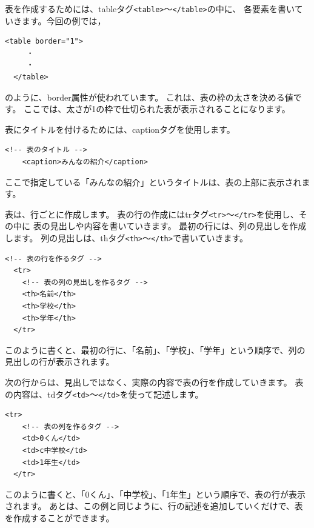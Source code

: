 \documentclass[text01.tex]{subfiles}
\begin{document}
\clearpage

表を作成するためには、tableタグ\texttt{<table>}～\texttt{</table>}の中に、
各要素を書いていきます。今回の例では，
\bigskip

\begin{lstlisting}[caption=表の作成,label=pwdtest,firstnumber=1]
  <table border="1">
     ・
     ・
  </table>
\end{lstlisting} 

\noindent%
のように、border属性が使われています。
これは、表の枠の太さを決める値です。
ここでは、太さが1の枠で仕切られた表が表示されることになります。

表にタイトルを付けるためには、captionタグを使用します。
\bigskip
\begin{lstlisting}[caption=表のタイトル,label=pwdtest,firstnumber=1]
    <!-- 表のタイトル -->
    <caption>みんなの紹介</caption>
\end{lstlisting} 
\noindent%
ここで指定している「みんなの紹介」というタイトルは、表の上部に表示されます。

表は、行ごとに作成します。
表の行の作成にはtrタグ\texttt{<tr>}～\texttt{</tr>}を使用し、その中に
表の見出しや内容を書いていきます。
最初の行には、列の見出しを作成します。
列の見出しは、thタグ\texttt{<th>}～\texttt{</th>}で書いていきます。
\bigskip

\begin{lstlisting}[caption=表の行（列の見出し）,label=pwdtest,firstnumber=1]
  <!-- 表の行を作るタグ -->
  <tr>
    <!-- 表の列の見出しを作るタグ -->
    <th>名前</th>
    <th>学校</th>
    <th>学年</th>
  </tr>
\end{lstlisting} 

\noindent%
このように書くと、最初の行に、「名前」、「学校」、「学年」という順序で、列の見出しの行が表示されます。

次の行からは、見出しではなく、実際の内容で表の行を作成していきます。
表の内容は、tdタグ\texttt{<td>}～\texttt{</td>}を使って記述します。
\bigskip

\begin{lstlisting}[caption=表の行,label=pwdtest,firstnumber=1]
  <tr>
    <!-- 表の列を作るタグ -->
    <td>0くん</td>
    <td>c中学校</td>
    <td>1年生</td>
  </tr>
\end{lstlisting} 

\noindent%
このように書くと、「0くん」、「中学校」、「1年生」という順序で、表の行が表示されます。
あとは、この例と同じように、行の記述を追加していくだけで、表を作成することができます。

\begin{tcolorbox}[title=\useOmetoi,breakable]
  \begin{enumerate}
  \end{enumerate}
\end{tcolorbox}
\clearpage
\end{document}
